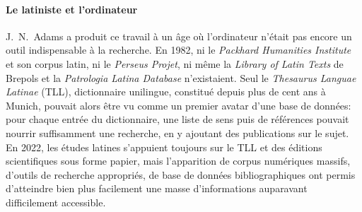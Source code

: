 \paragraph{Le latiniste et l'ordinateur}

J.~N.~Adams a produit ce travail à un âge où l'ordinateur n'était pas encore un outil indispensable à la recherche. En 1982, ni le \textit{Packhard Humanities Institute} et son corpus latin, ni le \textit{Perseus Projet}, ni même la \textit{Library of Latin Texts} de Brepols et la \textit{Patrologia Latina Database} n'existaient. Seul le \textit{Thesaurus Languae Latinae} (TLL), dictionnaire unilingue, constitué depuis plus de cent ans à Munich, pouvait alors être vu comme un premier avatar d'une base de données: pour chaque entrée du dictionnaire, une liste de sens puis de références pouvait nourrir suffisamment une recherche, en y ajoutant des publications sur le sujet. En 2022, les études latines s'appuient toujours sur le TLL et des éditions scientifiques sous forme papier, mais l'apparition de corpus numériques massifs, d'outils de recherche appropriés, de base de données bibliographiques ont permis d'atteindre bien plus facilement une masse d'informations auparavant difficilement accessible.

